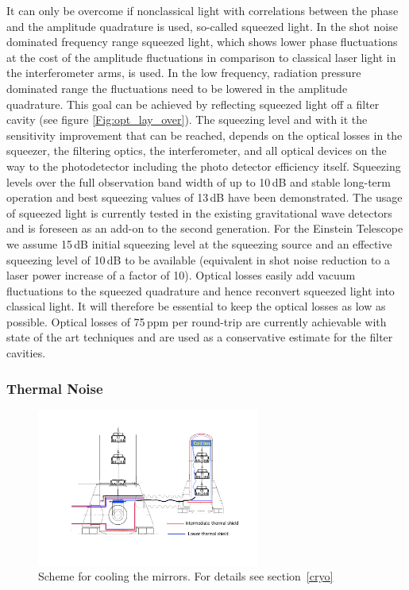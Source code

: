 It can only be overcome if nonclassical light with correlations between the phase and the amplitude quadrature is used, so-called squeezed light. In the shot noise dominated frequency range squeezed light, which shows lower phase fluctuations at the cost of the amplitude fluctuations in comparison to classical laser light in the interferometer arms, is used. In the low frequency, radiation pressure dominated range the fluctuations need to be lowered in the amplitude quadrature. This goal can be achieved by reflecting squeezed light off a filter cavity (see figure \ref{Fig:opt_lay_over}). The squeezing level and with it the sensitivity improvement that can be reached, depends on the optical losses in the squeezer, the filtering optics, the interferometer, and all optical devices on the way to the photodetector including the photo detector efficiency itself. Squeezing levels over the full observation band width of up to 10\,dB and stable long-term operation and best squeezing values of 13\,dB have been demonstrated. The usage of squeezed light is currently tested in the existing gravitational wave detectors and is foreseen as an add-on to the second generation. For the Einstein Telescope we assume 15\,dB initial squeezing level at the squeezing source and an effective squeezing level of 10\,dB to be available (equivalent in shot noise reduction to a laser power increase of a factor of 10). Optical losses easily add vacuum fluctuations  to the squeezed quadrature and hence reconvert squeezed light into classical light. It will therefore be essential to keep the optical losses as low as possible. Optical losses of 75\,ppm per round-trip are currently achievable with state of the art techniques and are used as a conservative estimate for the filter cavities.

\subsubsection{Thermal Noise}
\begin{figure}
	\centering
		\includegraphics[width=0.65\textwidth]{./Sec_SiteInfra/Figures/ET_main-cryostat.pdf}
	\caption{Scheme for cooling the mirrors. For details see section~\ref{cryo}}
\end{figure} 

